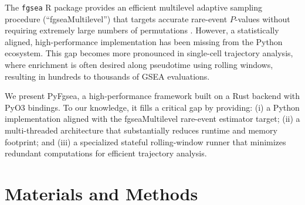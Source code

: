 \documentclass[numsec,webpdf,modern,large,numbered]{oup-authoring-template}
\newcommand{\rev}[1]{\textcolor{revisionred}{#1}}
\begin{document}
The \texttt{fgsea} R package provides an efficient multilevel adaptive sampling procedure (``fgseaMultilevel'') that targets accurate rare-event $P$-values without requiring extremely large numbers of permutations \citep{Korotkevich2021FGSEA}.
However, a statistically aligned, high-performance implementation has been missing from the Python ecosystem.
This gap becomes more pronounced in single-cell trajectory analysis, where enrichment is often desired along pseudotime using rolling windows, resulting in hundreds to thousands of GSEA evaluations.

We present PyFgsea, a high-performance framework built on a Rust backend with PyO3 bindings. \rev{To our knowledge, it fills a critical gap by providing: (i) a Python implementation aligned with the fgseaMultilevel rare-event estimator target; (ii) a multi-threaded architecture that substantially reduces runtime and memory footprint; and (iii) a specialized stateful rolling-window runner that minimizes redundant computations for efficient trajectory analysis.}

\section{Materials and Methods}
\end{document}

